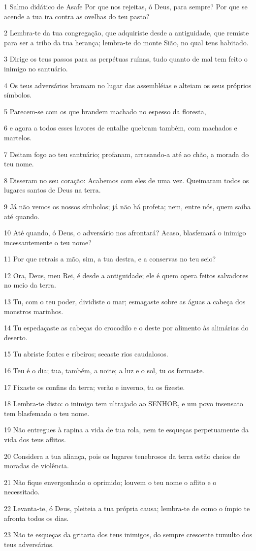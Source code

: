 \par 1 Salmo didático de Asafe Por que nos rejeitas, ó Deus, para sempre? Por que se acende a tua ira contra as ovelhas do teu pasto?
\par 2 Lembra-te da tua congregação, que adquiriste desde a antiguidade, que remiste para ser a tribo da tua herança; lembra-te do monte Sião, no qual tens habitado.
\par 3 Dirige os teus passos para as perpétuas ruínas, tudo quanto de mal tem feito o inimigo no santuário.
\par 4 Os teus adversários bramam no lugar das assembléias e alteiam os seus próprios símbolos.
\par 5 Parecem-se com os que brandem machado no espesso da floresta,
\par 6 e agora a todos esses lavores de entalhe quebram também, com machados e martelos.
\par 7 Deitam fogo ao teu santuário; profanam, arrasando-a até ao chão, a morada do teu nome.
\par 8 Disseram no seu coração: Acabemos com eles de uma vez. Queimaram todos os lugares santos de Deus na terra.
\par 9 Já não vemos os nossos símbolos; já não há profeta; nem, entre nós, quem saiba até quando.
\par 10 Até quando, ó Deus, o adversário nos afrontará? Acaso, blasfemará o inimigo incessantemente o teu nome?
\par 11 Por que retrais a mão, sim, a tua destra, e a conservas no teu seio?
\par 12 Ora, Deus, meu Rei, é desde a antiguidade; ele é quem opera feitos salvadores no meio da terra.
\par 13 Tu, com o teu poder, dividiste o mar; esmagaste sobre as águas a cabeça dos monstros marinhos.
\par 14 Tu espedaçaste as cabeças do crocodilo e o deste por alimento às alimárias do deserto.
\par 15 Tu abriste fontes e ribeiros; secaste rios caudalosos.
\par 16 Teu é o dia; tua, também, a noite; a luz e o sol, tu os formaste.
\par 17 Fixaste os confins da terra; verão e inverno, tu os fizeste.
\par 18 Lembra-te disto: o inimigo tem ultrajado ao SENHOR, e um povo insensato tem blasfemado o teu nome.
\par 19 Não entregues à rapina a vida de tua rola, nem te esqueças perpetuamente da vida dos teus aflitos.
\par 20 Considera a tua aliança, pois os lugares tenebrosos da terra estão cheios de moradas de violência.
\par 21 Não fique envergonhado o oprimido; louvem o teu nome o aflito e o necessitado.
\par 22 Levanta-te, ó Deus, pleiteia a tua própria causa; lembra-te de como o ímpio te afronta todos os dias.
\par 23 Não te esqueças da gritaria dos teus inimigos, do sempre crescente tumulto dos teus adversários.


